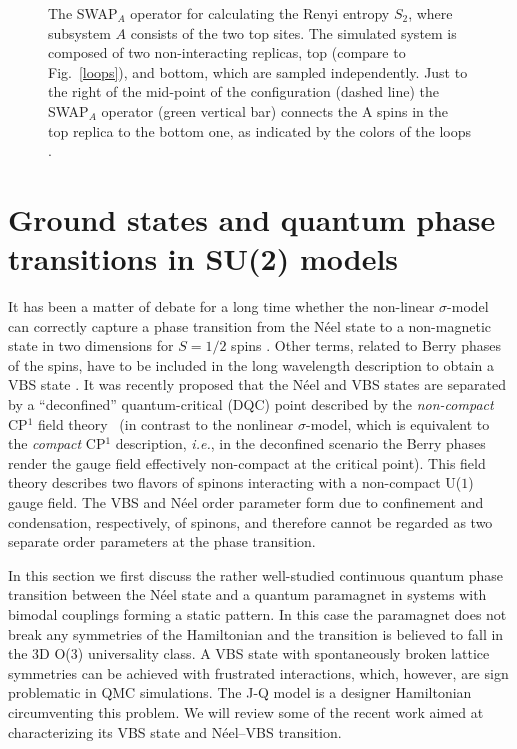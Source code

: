 \documentclass[range]{ar2e}
\begin{document}
\begin{figure}
\centerline{}
\caption{The {\rm SWAP}$_A$ operator for calculating the Renyi entropy $S_2$, where subsystem $A$ consists of the two top sites. The simulated system is 
composed of two non-interacting replicas, top (compare to Fig.~\ref{loops}), and bottom, which are sampled independently. Just to the right of the mid-point 
of the configuration (dashed line) the {\rm SWAP}$_A$ operator (green vertical bar) connects the A spins in the top replica to the bottom one, as indicated by 
the colors of the loops \cite{Kallin11}.}
\label{swap}
\end{figure}

\section{Ground states and quantum phase transitions in SU(2) models}
\label{sec:su2models}

It has been a matter of debate for a long time whether the non-linear $\sigma$-model can correctly capture a phase transition from the N\'eel state 
to a non-magnetic state in two dimensions for $S=1/2$ spins \cite{Chakravarty89}. Other terms, related to Berry phases of the spins, have to be included in the long wavelength description to obtain a VBS state \cite{Read90,murthy1990:mono}. It was recently proposed that the N\'eel and VBS states are separated
by a ``deconfined'' quantum-critical (DQC) point \cite{Senthil04a} described by the {\it non-compact} CP$^1$ field theory~\cite{Motrunich04} (in contrast to the nonlinear 
$\sigma$-model, which is equivalent to the {\it compact} CP$^1$ description, {\em i.e.}, in the deconfined scenario the Berry phases render the gauge field effectively
non-compact at the critical point).
This field theory describes two flavors of spinons interacting with a non-compact U($1$) gauge field.  The VBS and N\'eel order parameter form due to confinement and condensation, 
respectively, of spinons, and therefore cannot be regarded as two separate order parameters at the phase transition.

In this section we first discuss the rather well-studied continuous quantum phase transition between the N\'eel state and a quantum paramagnet in systems 
with bimodal couplings forming a static pattern. In this case the paramagnet does not break any symmetries of the Hamiltonian and the transition 
is believed to fall in the 3D O($3$) universality class. A VBS state with spontaneously broken lattice symmetries can be achieved with frustrated 
interactions, which, however, are sign problematic in QMC simulations. The J-Q model \cite{Sandvik07} is a designer Hamiltonian circumventing this 
problem. We will review some of the recent work aimed at characterizing its VBS state and  N\'eel--VBS transition.
\end{document}
